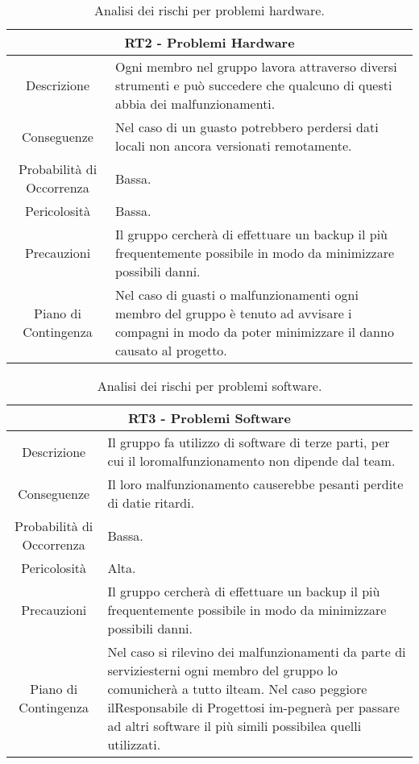\begin{table}
    \begin{tabular}{|c | p{10cm}|}
    \hline
    \multicolumn{2}{|c|}{\textbf{RT2 - Problemi Hardware}} \\
    \hline
     Descrizione & Ogni membro nel gruppo lavora attraverso diversi strumenti e può succedere che qualcuno di questi abbia dei malfunzionamenti.\\ 
     \hline
     Conseguenze & Nel caso di un guasto potrebbero perdersi dati locali non ancora versionati remotamente.\\
     \hline
     Probabilità di Occorrenza & Bassa.\\
     \hline
     Pericolosità & Bassa.\\
     \hline
     Precauzioni & Il gruppo cercherà di effettuare un backup il più frequentemente possibile in modo da minimizzare possibili danni.\\  
     \hline
     Piano di Contingenza & Nel caso di guasti o malfunzionamenti ogni membro del gruppo è tenuto ad avvisare i compagni in modo da poter minimizzare il danno causato al progetto.\\ 
     \hline
    \end{tabular}
    \caption{\label{tab:RT2}Analisi dei rischi per problemi hardware.}
    \end{table}


\begin{table}
    \begin{tabular}{|c | p{10cm}|}
    \hline
    \multicolumn{2}{|c|}{\textbf{RT3 - Problemi Software}} \\
    \hline
    Descrizione & Il gruppo fa utilizzo di software di terze parti, per cui il loromalfunzionamento non dipende dal team.\\ 
    \hline
    Conseguenze & Il loro malfunzionamento causerebbe pesanti perdite di datie ritardi.\\
    \hline
    Probabilità di Occorrenza & Bassa.\\
    \hline
    Pericolosità & Alta.\\
    \hline
    Precauzioni & Il gruppo cercherà di effettuare un backup il più frequentemente possibile in modo da minimizzare possibili danni.\\ 
    \hline
    Piano di Contingenza & Nel caso si rilevino dei malfunzionamenti da parte di serviziesterni ogni membro del gruppo lo comunicherà a tutto ilteam. Nel caso peggiore ilResponsabile di Progettosi im-pegnerà per passare ad altri software il più simili possibilea quelli utilizzati.\\ 
    \hline
    \end{tabular}
    \caption{\label{tab:RT3}Analisi dei rischi per problemi software.}
    
\end{table}